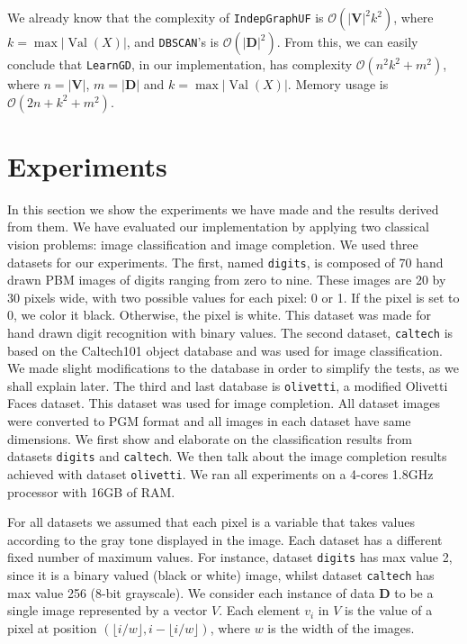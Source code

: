 \documentclass{amsart}
\DeclareMathOperator*{\Val}{\text{Val}}
\theoremstyle{plain}
\numberwithin{equation}{section}
\newcommand{\set}[1]{\mathbf{#1}}
\newcommand{\bigo}{\mathcal{O}}
\newcommand{\code}[1]{\lstinline[mathescape=true]{#1}}
\begin{document}
We already know that the complexity of \code{IndepGraphUF} is $\bigo(|\set{V}|^2 k^2)$, where
$k=\max |\Val(X)|$, and \code{DBSCAN}'s is $\bigo(|\set{D}|^2)$. From this, we can easily conclude
that \code{LearnGD}, in our implementation, has complexity $\bigo(n^2 k^2 + m^2)$, where
$n=|\set{V}|$, $m=|\set{D}|$ and $k=\max |\Val(X)|$. Memory usage is $\bigo(2n+k^2+m^2)$.

\section{Experiments}

In this section we show the experiments we have made and the results derived from them. We have
evaluated our implementation by applying two classical vision problems: image classification and
image completion. We used three datasets for our experiments. The first, named \code{digits}, is
composed of 70 hand drawn PBM images of digits ranging from zero to nine. These images are 20 by 30
pixels wide, with two possible values for each pixel: 0 or 1. If the pixel is set to 0, we color it
black. Otherwise, the pixel is white. This dataset was made for hand drawn digit recognition with
binary values. The second dataset, \code{caltech} is based on the Caltech101 object database
\cite{caltech101} and was used for image classification. We made slight modifications to the
database in order to simplify the tests, as we shall explain later. The third and last database is
\code{olivetti}, a modified Olivetti Faces dataset. This dataset was used for image completion. All
dataset images were converted to PGM format and all images in each dataset have same dimensions.
We first show and elaborate on the classification results from datasets \code{digits} and
\code{caltech}. We then talk about the image completion results achieved with dataset
\code{olivetti}. We ran all experiments on a 4-cores 1.8GHz processor with 16GB of RAM\@.

For all datasets we assumed that each pixel is a variable that takes values according to the gray
tone displayed in the image. Each dataset has a different fixed number of maximum values. For
instance, dataset \code{digits} has max value 2, since it is a binary valued (black or white)
image, whilst dataset \code{caltech} has max value 256 (8-bit grayscale). We consider each instance
of data $\set{D}$ to be a single image represented by a vector $V$. Each element $v_i$ in $V$ is
the value of a pixel at position $(\lfloor i/w \rfloor, i-\lfloor i/w \rfloor)$, where $w$ is the
width of the images.
\end{document}
